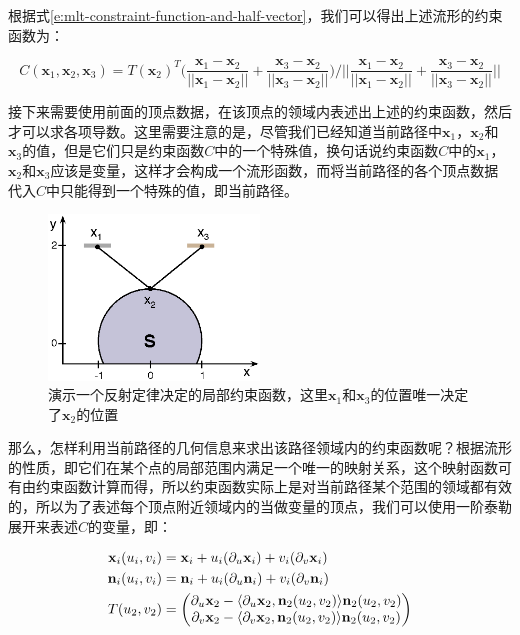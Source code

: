 \noindent 根据式\ref{e:mlt-constraint-function-and-half-vector}，我们可以得出上述流形的约束函数为：

\begin{equation}\label{e:mlt-example-c}
	C(\mathbf{x}_1,\mathbf{x}_2,\mathbf{x}_3)=T(\mathbf{x}_2)^{T}\Biggl(\frac{\mathbf{x}_1-\mathbf{x}_2}{||\mathbf{x}_1-\mathbf{x}_2||}+\frac{\mathbf{x}_3-\mathbf{x}_2}{||\mathbf{x}_3-\mathbf{x}_2||}\Biggl) \Biggl/
		\Biggl|\Biggl|\frac{\mathbf{x}_1-\mathbf{x}_2}{||\mathbf{x}_1-\mathbf{x}_2||}+\frac{\mathbf{x}_3-\mathbf{x}_2}{||\mathbf{x}_3-\mathbf{x}_2||}\Biggl|\Biggl|
\end{equation}

接下来需要使用前面的顶点数据，在该顶点的领域内表述出上述的约束函数，然后才可以求各项导数。这里需要注意的是，尽管我们已经知道当前路径中$\mathbf{x}_1$，$\mathbf{x}_2$和$\mathbf{x}_3$的值，但是它们只是约束函数$C$中的一个特殊值，换句话说约束函数$C$中的$\mathbf{x}_1$，$\mathbf{x}_2$和$\mathbf{x}_3$应该是变量，这样才会构成一个流形函数，而将当前路径的各个顶点数据代入$C$中只能得到一个特殊的值，即当前路径。

\begin{figure}
	\sidecaption
	\includegraphics[width=0.5\textwidth]{figures/mlt/example}
	\caption{演示一个反射定律决定的局部约束函数，这里$\mathbf{x}_1$和$\mathbf{x}_3$的位置唯一决定了$\mathbf{x}_2$的位置}
	\label{f:mlt-example}
\end{figure}

那么，怎样利用当前路径的几何信息来求出该路径领域内的约束函数呢？根据流形的性质，即它们在某个点的局部范围内满足一个唯一的映射关系，这个映射函数可有由约束函数计算而得，所以约束函数实际上是对当前路径某个范围的领域都有效的，所以为了表述每个顶点附近领域内的当做变量的顶点，我们可以使用一阶泰勒展开来表述$C$的变量，即：

\begin{equation}
\begin{aligned}
	\mathbf{x}_i(u_i,v_i)&=\mathbf{x}_i+u_i({\rm \partial}_u\mathbf{x}_i)+v_i({\rm \partial}_v\mathbf{x}_i)\\
	\mathbf{n}_i(u_i,v_i)&=\mathbf{n}_i+u_i({\rm \partial}_u\mathbf{n}_i)+v_i({\rm \partial}_v\mathbf{n}_i)\\
	T(u_2,v_2)&=\begin{pmatrix}
		{\rm \partial}_u\mathbf{x}_2-\langle{\rm \partial}_u\mathbf{x}_2,\mathbf{n}_2(u_2,v_2)\rangle\mathbf{n}_2(u_2,v_2)\\
		{\rm \partial}_v\mathbf{x}_2-\langle{\rm \partial}_v\mathbf{x}_2,\mathbf{n}_2(u_2,v_2)\rangle\mathbf{n}_2(u_2,v_2)
	\end{pmatrix}
\end{aligned}
\end{equation}

